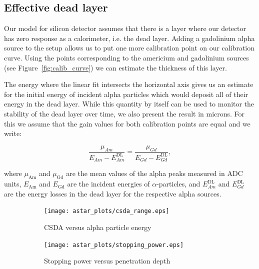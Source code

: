 \documentclass[a4paper,12pt]{article}
\begin{document}
\subsection{Effective dead layer}

Our model for silicon detector assumes that there is a layer where our detector
has zero response as a calorimeter, i.e. the dead layer. Adding a gadolinium
alpha source to the setup allows us to put one more calibration point on our
calibration curve. Using the points corresponding to the americium and
gadolinium sources (see Figure~\ref{fig:calib_curve}) we can estimate the
thickness of this layer.

The energy where the linear fit intersects the horizontal axis gives us an
estimate for the initial energy of incident alpha particles which would deposit
all of their energy in the dead layer. While this quantity by itself can be used
to monitor the stability of the dead layer over time, we also present the result
in microns. For this we assume that the gain values for both calibration points
are equal and we write:

\begin{equation}
\frac{\mu_{Am}}{E_{Am} - E^\text{DL}_{Am}} = \frac{\mu_{Gd}}{E_{Gd} - E^\text{DL}_{Gd}},
\label{eq:gain_equality}
\end{equation}

\noindent where $\mu_\text{Am}$ and $\mu_\text{Gd}$ are the mean values of the
alpha peaks measured in ADC units, $E_\text{Am}$ and $E_\text{Gd}$ are the
incident energies of $\alpha$-particles, and $E^\text{DL}_{Am}$ and
$E^\text{DL}_{Gd}$ are the energy losses in the dead layer for the respective
alpha sources.

\begin{figure}
\begin{subfigure}[b]{0.5\textwidth}
\texttt{[image: astar\_plots/csda\_range.eps]}
\caption{CSDA versus alpha particle energy}\label{subfig:csda_range}
\end{subfigure}
\begin{subfigure}[b]{0.5\textwidth}
\texttt{[image: astar\_plots/stopping\_power.eps]}
\caption{Stopping power versus penetration depth}\label{subfig:stopping_power}
\end{subfigure}
\caption{}\label{fig:astar_plots}
\end{figure}
\end{document}
